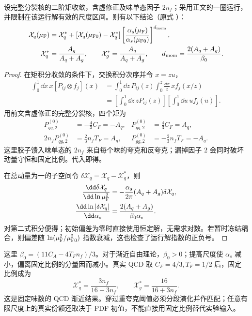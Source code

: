 \begin{proposition}[动量矩的闭合与守恒方向]
设完整分裂核的二阶矩收敛，含虚修正及味单态因子 $2n_f$；采用正文的一圈运行，并限制在该运行解有效的尺度区间。则有以下结论（原式 ）：
\begin{equation*}
 \begin{aligned}
 \mathcal X_q(\mu_{\rm F})
 &=\mathcal X_q^*+
 [\mathcal X_q(\mu_{\rm F0})-\mathcal X_q^*]
 \left[\frac{\alpha_s(\mu_{\rm F})}{\alpha_s(\mu_{\rm F0})}\right]^{d_{\rm mom}},\\
 \mathcal X_q^*&=\frac{A_g}{A_q+A_g},\qquad
 \mathcal X_g^*=\frac{A_q}{A_q+A_g},\qquad
 d_{\rm mom}=\frac{2(A_q+A_g)}{\beta_0}.
 \end{aligned}
\end{equation*}
\end{proposition}
\begin{proof}
在矩积分收敛的条件下，交换积分次序并令 $x=zu$，
\begin{align*}
 \int_0^1\dd x\,x[P_{ij}\otimes f_j](x)
 &=\int_0^1\dd z\,P_{ij}(z)\int_0^z\frac{\dd x}{z}\,x f_j(x/z)\\
 &=\left[\int_0^1\dd z\,zP_{ij}(z)\right]
   \left[\int_0^1\dd u\,u f_j(u)\right].
\end{align*}
用前文含虚修正的完整分裂核，四个矩为
\begin{align*}
 P_{qq,2}^{(0)}&=-\frac43C_F=-A_q,&
 P_{gq,2}^{(0)}&=\frac43C_F=A_q,\\
 2n_fP_{qg,2}^{(0)}&=\frac23n_fT_F=A_g,&
 P_{gg,2}^{(0)}&=-\frac23n_fT_F=-A_g.
\end{align*}
这里胶子馈入味单态的 $2n_f$ 来自每个味的夸克和反夸克；漏掉因子 $2$ 会同时破坏动量守恒和固定比例。代入即得。

在总动量为一的子空间令 $\delta\mathcal X_q=\mathcal X_q-\mathcal X_q^*$，则
\begin{align*}
 \frac{\dd\delta\mathcal X_q}{\dd\ln\mu_{\rm F}^2}
 &=-\frac{\alpha_s}{2\pi}(A_q+A_g)\delta\mathcal X_q,\\
 \frac{\dd\ln|\delta\mathcal X_q|}{\dd\alpha_s}
 &=\frac{2(A_q+A_g)}{\beta_0\alpha_s}.
\end{align*}
对第二式积分便得；初始偏差为零时直接使用恒定解，无需求对数。若暂时冻结耦合，则偏差随 $\ln(\mu_{\rm F}^2/\mu_{\rm F0}^2)$ 指数衰减，这也检查了运行解指数的正负号。
\end{proof}

这里 $\beta_0=(11C_A-4T_Fn_f)/3$。对于渐近自由理论，$\beta_0>0$；提高尺度使 $\alpha_s$ 减小，偏离固定比例的分量因而减小。真实 QCD 取 $C_F=4/3,T_F=1/2$ 后，固定比例成为
\begin{equation*}
 \mathcal X_q^*=\frac{3n_f}{16+3n_f},\qquad
 \mathcal X_g^*=\frac{16}{16+3n_f}.
\end{equation*}
这是固定味数的 QCD 渐近结果。穿过重夸克阈值必须分段演化并作匹配；任意有限尺度上的真实份额还取决于 PDF 初值，不能直接用固定比例替代实验输入。

